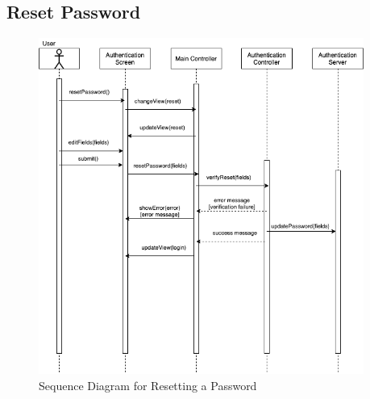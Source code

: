 \documentclass[]{article}
\begin{document}
\subsection{Reset Password}
\label{sub:reset_pass_seq}
\begin{figure}[H]
\begin{center}
\includegraphics[width=0.95\textwidth]{D3/images/ResetPassword.png}
\end{center}
\caption{Sequence Diagram for Resetting a Password}
\label{fig:Reset Password}
\end{figure}
\end{document}
